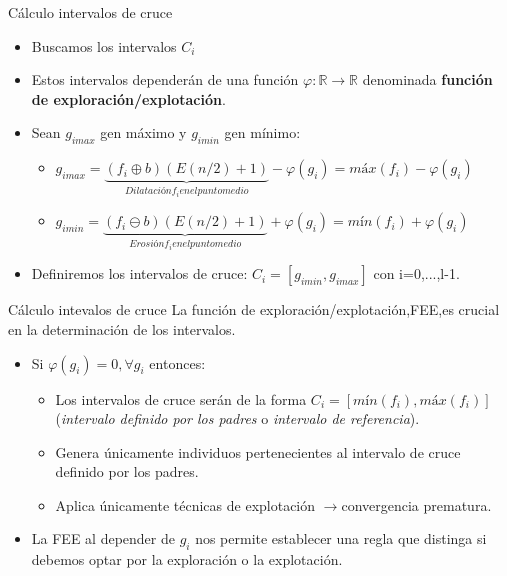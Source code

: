 \documentclass[10pt]{beamer}
\begin{document}
\begin{frame}{Cálculo intervalos de cruce}
	\begin{itemize}
		\item Buscamos los intervalos $C_{i}$
		\item Estos intervalos dependerán de una función $\varphi:\mathbb{R}\rightarrow\mathbb{R}$ denominada \textbf{función de exploración/explotación}.
		\item Sean $g_{imax}$ gen máximo y $g_{imin}$ gen mínimo:
		\begin{itemize}
			\item $g_{imax}=\underbrace{(f_{i}\oplus b)(E(n/2)+1)}_{Dilatación f_{i} en el punto medio}-\varphi(g_{i}) = máx(f_{i})-\varphi(g_{i})$
			\item $g_{imin}=\underbrace{(f_{i}\ominus b)(E(n/2)+1)}_{Erosión f_{i} en el punto medio}+\varphi(g_{i}) = mín(f_{i})+\varphi(g_{i})$
		\end{itemize}
		\item Definiremos los intervalos de cruce: $C_{i}=[g_{imin},g_{imax}]$ con i=0,...,l-1.
	\end{itemize}
\end{frame}
\begin{frame}{Cálculo intevalos de cruce}
	La función de exploración/explotación,FEE,es crucial en la determinación de los intervalos.
	\begin{itemize}
		\item Si $\varphi(g_{i})=0,\forall g_{i}$ entonces:
		\begin{itemize}
			\item Los intervalos de cruce serán de la forma $C_{i}=[mín(f_{i}),máx(f_{i})]$(\textit{intervalo definido por los padres} o \textit{intervalo de referencia}).
			\item Genera únicamente individuos pertenecientes al intervalo de cruce definido por los padres.
			\item Aplica únicamente técnicas de explotación $\rightarrow$convergencia prematura.
		\end{itemize}
		\item La FEE al depender de $g_{i}$ nos permite establecer una regla que distinga si debemos optar por la exploración o la explotación.
	\end{itemize}
\end{frame}
\end{document}

